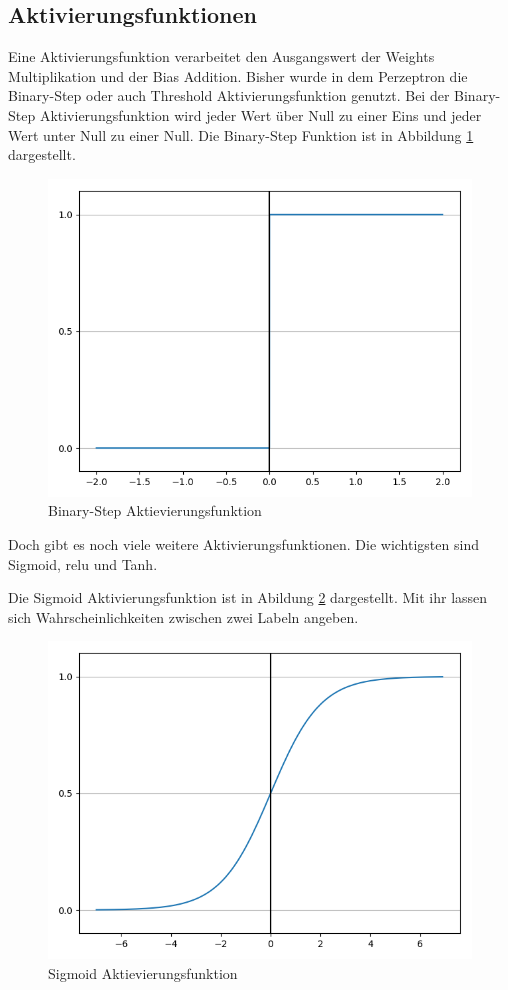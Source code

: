 \documentclass[conference, german]{IEEEtran}
\begin{document}
\subsection{Aktivierungsfunktionen}
Eine Aktivierungsfunktion verarbeitet den Ausgangswert der Weights Multiplikation und der Bias Addition. Bisher wurde in dem Perzeptron die Binary-Step oder auch Threshold Aktivierungsfunktion genutzt. Bei der Binary-Step Aktivierungsfunktion wird jeder Wert über Null zu einer Eins und jeder Wert unter Null zu einer Null. Die Binary-Step Funktion ist in Abbildung \ref{fig:binary} dargestellt. 
\begin{figure}[H]
	\includegraphics[width=\linewidth]{plots/binary_step.png}
	\caption{Binary-Step Aktievierungsfunktion}
	\label{fig:binary}
\end{figure}

Doch gibt es noch viele weitere Aktivierungsfunktionen. Die wichtigsten sind Sigmoid, \ac{relu} und Tanh.

Die Sigmoid Aktivierungsfunktion ist in Abildung \ref{fig:sigmoid} dargestellt. Mit ihr lassen sich Wahrscheinlichkeiten zwischen zwei Labeln angeben.

\begin{figure}[H]
	\includegraphics[width=\linewidth]{plots/sigmoid.png}
	\caption{Sigmoid Aktievierungsfunktion}
	\label{fig:sigmoid}
\end{figure}
\end{document}
